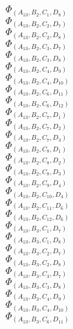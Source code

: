 \documentclass[14pt]{article}
\begin{document}
    $\Phi_{({A}_{13}, {B}_{2}, {C}_{1}, {D}_{8})}$ \\ 
    $\Phi_{({A}_{13}, {B}_{2}, {C}_{2}, {D}_{7})}$ \\ 
    $\Phi_{({A}_{13}, {B}_{2}, {C}_{2}, {D}_{8})}$ \\ 
    $\Phi_{({A}_{13}, {B}_{2}, {C}_{3}, {D}_{7})}$ \\ 
    $\Phi_{({A}_{13}, {B}_{2}, {C}_{3}, {D}_{8})}$ \\ 
    $\Phi_{({A}_{13}, {B}_{2}, {C}_{4}, {D}_{9})}$ \\ 
    $\Phi_{({A}_{13}, {B}_{2}, {C}_{4}, {D}_{10})}$ \\ 
    $\Phi_{({A}_{13}, {B}_{2}, {C}_{6}, {D}_{11})}$ \\ 
    $\Phi_{({A}_{13}, {B}_{2}, {C}_{6}, {D}_{12})}$ \\ 
    $\Phi_{({A}_{13}, {B}_{2}, {C}_{7}, {D}_{1})}$ \\ 
    $\Phi_{({A}_{13}, {B}_{2}, {C}_{7}, {D}_{2})}$ \\ 
    $\Phi_{({A}_{13}, {B}_{2}, {C}_{7}, {D}_{3})}$ \\ 
    $\Phi_{({A}_{13}, {B}_{2}, {C}_{8}, {D}_{1})}$ \\ 
    $\Phi_{({A}_{13}, {B}_{2}, {C}_{8}, {D}_{2})}$ \\ 
    $\Phi_{({A}_{13}, {B}_{2}, {C}_{8}, {D}_{3})}$ \\ 
    $\Phi_{({A}_{13}, {B}_{2}, {C}_{9}, {D}_{4})}$ \\ 
    $\Phi_{({A}_{13}, {B}_{2}, {C}_{10}, {D}_{4})}$ \\ 
    $\Phi_{({A}_{13}, {B}_{2}, {C}_{11}, {D}_{6})}$ \\ 
    $\Phi_{({A}_{13}, {B}_{2}, {C}_{12}, {D}_{6})}$ \\ 
    $\Phi_{({A}_{13}, {B}_{3}, {C}_{1}, {D}_{7})}$ \\ 
    $\Phi_{({A}_{13}, {B}_{3}, {C}_{1}, {D}_{8})}$ \\ 
    $\Phi_{({A}_{13}, {B}_{3}, {C}_{2}, {D}_{7})}$ \\ 
    $\Phi_{({A}_{13}, {B}_{3}, {C}_{2}, {D}_{8})}$ \\ 
    $\Phi_{({A}_{13}, {B}_{3}, {C}_{3}, {D}_{7})}$ \\ 
    $\Phi_{({A}_{13}, {B}_{3}, {C}_{3}, {D}_{8})}$ \\ 
    $\Phi_{({A}_{13}, {B}_{3}, {C}_{4}, {D}_{9})}$ \\ 
    $\Phi_{({A}_{13}, {B}_{3}, {C}_{4}, {D}_{10})}$ \\ 
    $\Phi_{({A}_{13}, {B}_{3}, {C}_{6}, {D}_{11})}$ \\ 
\end{document}
